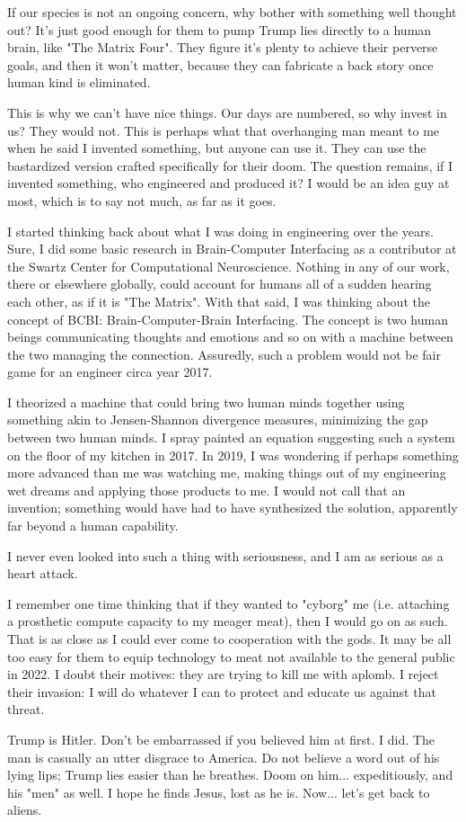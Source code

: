 \documentclass{article}
\begin{document}
\begin{multicols}{2}
If our species is not an ongoing concern, why bother with something well thought out? It's just good enough for them to pump Trump lies directly to a human brain, like "The Matrix Four". They figure it's plenty to achieve their perverse goals, and then it won't matter, because they can fabricate a back story once human kind is eliminated. 

This is why we can't have nice things. Our days are numbered, so why invest in us? They would not. This is perhaps what that overhanging man meant to me when he said I invented something, but anyone can use it. They can use the bastardized version crafted specifically for their doom. The question remains, if I invented something, who engineered and produced it? I would be an idea guy at most, which is to say not much, as far as it goes. 

I started thinking back about what I was doing in engineering over the years. Sure, I did some basic research in Brain-Computer Interfacing as a contributor at the Swartz Center for Computational Neuroscience. Nothing in any of our work, there or elsewhere globally, could account for humans all of a sudden hearing each other, as if it is "The Matrix". With that said, I was thinking about the concept of BCBI: Brain-Computer-Brain Interfacing. The concept is two human beings communicating thoughts and emotions and so on with a machine between the two managing the connection. Assuredly, such a problem would not be fair game for an engineer circa year 2017. 

I theorized a machine that could bring two human minds together using something akin to Jensen-Shannon divergence measures, minimizing the gap between two human minds. I spray painted an equation suggesting such a system on the floor of my kitchen in 2017. In 2019, I was wondering if perhaps something more advanced than me was watching  me, making things out of my engineering wet dreams and applying those products to me. I would not call that an invention; something would have had to have  synthesized the solution, apparently far beyond a human capability. 

I never even looked into such a thing with seriousness, and I am as serious as a heart attack. 

I remember one time thinking that if they wanted to "cyborg" me (i.e. attaching a prosthetic compute capacity to my meager meat), then I would go on as such. That is as close as I could ever come to cooperation with the gods. It may be all too easy for them to equip technology to meat not available to the general public in 2022. I doubt their motives: they are trying to kill me with aplomb. I reject their invasion: I will do whatever I can to protect and educate us against that threat.

Trump is Hitler. Don't be embarrassed if you believed him at first. I did. The man is casually an utter disgrace to America. Do not believe a word out of his lying lips; Trump lies easier than he breathes. Doom on him... expeditiously, and his "men" as well. I hope he finds Jesus, lost as he is. Now... let's get back to aliens.

\end{multicols}
\end{document}
